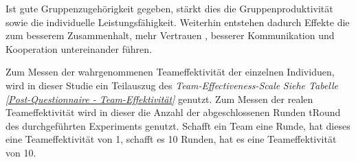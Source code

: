\documentclass[a4paper,11pt]{article}%
\renewcommand{\\}{\vspace*{0.5\baselineskip} \newline}
\begin{document}
	Ist gute Gruppenzugehörigkeit gegeben, stärkt dies die Gruppenproduktivität sowie die individuelle Leistungsfähigkeit. Weiterhin entstehen dadurch Effekte die zum besserem Zusammenhalt, mehr Vertrauen \citep{herbsleb2000distance}, besserer Kommunikation und Kooperation untereinander führen. \citep[p. 510]{olson2003psychological}

Zum Messen der wahrgenommenen Teameffektivität der einzelnen Individuen, wird in dieser Studie ein Teilauszug des \textit{Team-Effectiveness-Scale} \textit{Siehe Tabelle \ref{Post-Questionnaire - Team-Effektivität}} \citep[p.469]{gibson2003team} genutzt. Zum Messen der realen Teameffektivität wird in dieser die Anzahl der abgeschlossenen Runden \ac{tRound} des durchgeführten Experiments genutzt. Schafft ein Team eine Runde, hat dieses eine Teameffektivität von 1, schafft es 10 Runden, hat es eine Teameffektivität von 10.
\end{document}
